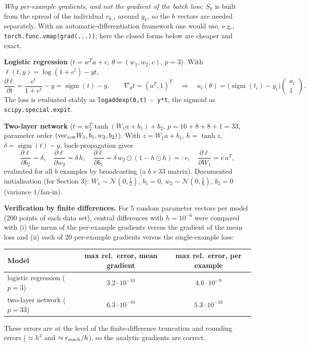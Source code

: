 \documentclass[11pt,a4paper]{article}
\begin{document}
\emph{Why per-example gradients, and not the gradient of the batch loss:} $S_k$ is
built from the spread of the individual $v_{k,i}$ around $g_k$, so the $b$ vectors are
needed separately. With an automatic-differentiation framework one would use, e.g.,
\texttt{torch.func.vmap(grad(...))}; here the closed forms below are cheaper and exact.

\textbf{Logistic regression} ($t=w^Ta+c$, $\theta=(w_1,w_2,c)$, $p=3$). With
$\ell(t,y)=\log(1+e^t)-yt$,
\begin{equation*}
\frac{\partial\ell}{\partial t}=\frac{e^t}{1+e^t}-y=\operatorname{sigm}(t)-y,\qquad
\nabla_\theta t=(a^T,1)^T\quad\Longrightarrow\quad
u_i(\theta)=\big(\operatorname{sigm}(t_i)-y_i\big)\begin{pmatrix}a_i\\1\end{pmatrix}.
\end{equation*}
The loss is evaluated stably as \texttt{logaddexp(0,t) - y*t}, the sigmoid as
\texttt{scipy.special.expit}.

\textbf{Two-layer network} ($t=w_2^T\tanh(W_1a+b_1)+b_2$, $p=16+8+8+1=33$, parameter
order $(\mathrm{vec}_{\rm row}W_1,b_1,w_2,b_2)$). With $z=W_1a+b_1$, $h=\tanh z$,
$\delta=\operatorname{sigm}(t)-y$, back-propagation gives
\begin{equation*}
\frac{\partial\ell}{\partial b_2}=\delta,\quad
\frac{\partial\ell}{\partial w_2}=\delta\,h,\quad
\frac{\partial\ell}{\partial b_1}=\delta\,w_2\odot(1-h\odot h)=:e,\quad
\frac{\partial\ell}{\partial W_1}=e\,a^T,
\end{equation*}
evaluated for all $b$ examples by broadcasting (a $b\times33$ matrix). Documented
initialisation (for Section 3): $W_1\sim\mathcal N(0,\tfrac12)$, $b_1=0$,
$w_2\sim\mathcal N(0,\tfrac18)$, $b_2=0$ (variance $1/\text{fan-in}$).

\textbf{Verification by finite differences.} For 5 random parameter vectors per model
(200 points of each data set), central differences with $h=10^{-6}$ were compared
with (i) the mean of the per-example gradients versus the gradient of the mean loss
and (ii) each of 20 per-example gradients versus the single-example loss:

\begin{center}
\begin{tabular}{@{}lcc@{}}
\toprule
Model & max rel.\ error, mean gradient & max rel.\ error, per example \\
\midrule
logistic regression ($p=3$) & $3.2\cdot10^{-10}$ & $4.6\cdot10^{-9}$ \\
two-layer network ($p=33$) & $6.3\cdot10^{-10}$ & $5.3\cdot10^{-10}$ \\
\bottomrule
\end{tabular}
\end{center}
These errors are at the level of the finite-difference truncation and rounding errors
($\approx h^2$ and $\approx\epsilon_{\rm mach}/h$), so the analytic gradients are correct.
\end{document}
